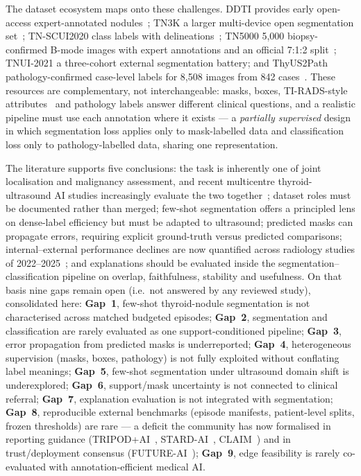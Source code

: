 \documentclass[jimh,article,submit,moreauthors,pdftex]{Definitions/tsp}
\begin{document}
The dataset ecosystem maps onto these challenges. DDTI provides early
open-access expert-annotated nodules~\cite{rev_pedraza2015ddti}; TN3K a
larger multi-device open segmentation set~\cite{rev_gong2021tn3k};
TN-SCUI2020 class labels with delineations~\cite{rev_zhou2020tnscui};
TN5000 5{,}000 biopsy-confirmed B-mode images with expert annotations and
an official 7:1:2 split~\cite{rev_zhang2025tn5000}; TNUI-2021 a
three-cohort external segmentation battery; and ThyUS2Path
pathology-confirmed case-level labels for 8{,}508 images from 842
cases~\cite{rev_hou2024thyus2path}. These resources are complementary,
not interchangeable: masks, boxes, TI-RADS-style
attributes~\cite{rev_tessler2017tirads} and
pathology labels answer different clinical questions, and a realistic
pipeline must use each annotation where it exists --- a
\emph{partially supervised} design in which segmentation loss applies
only to mask-labelled data and classification loss only to
pathology-labelled data, sharing one representation.

The literature supports five conclusions: the task is inherently one of
joint localisation and malignancy assessment, and recent multicentre
thyroid-ultrasound AI studies increasingly evaluate the two
together~\cite{rev_chen2024composition,rev_zhou2025tnvis,rev_zhan2025meta,rev_ni2025meta};
dataset roles must be documented rather than merged; few-shot segmentation
offers a principled lens on dense-label efficiency but must be adapted to
ultrasound; predicted masks can propagate errors, requiring explicit
ground-truth versus predicted comparisons; internal--external performance
declines are now quantified across radiology studies of 2022--2025~\cite{rev_suleman2025generaliz};
and explanations should be evaluated inside
the segmentation--classification pipeline on overlap, faithfulness,
stability and usefulness. On that basis nine gaps remain open (i.e.~not
answered by any reviewed study), consolidated here:
\textbf{Gap~1}, few-shot thyroid-nodule segmentation is not characterised
across matched budgeted episodes; \textbf{Gap~2}, segmentation and
classification are rarely evaluated as one support-conditioned pipeline;
\textbf{Gap~3}, error propagation from predicted masks is underreported;
\textbf{Gap~4}, heterogeneous supervision (masks, boxes, pathology) is
not fully exploited without conflating label meanings; \textbf{Gap~5},
few-shot segmentation under ultrasound domain shift is underexplored;
\textbf{Gap~6}, support/mask uncertainty is not connected to clinical
referral; \textbf{Gap~7}, explanation evaluation is not integrated with
segmentation; \textbf{Gap~8}, reproducible external benchmarks
(episode manifests, patient-level splits, frozen thresholds) are rare
--- a deficit the community has now formalised in reporting guidance
(TRIPOD+AI~\cite{rev_collins2024tripod},
STARD-AI~\cite{rev_sounderajah2025stardai},
CLAIM~\cite{rev_tejani2024claim}) and in trust/deployment consensus
(FUTURE-AI~\cite{rev_lekadir2025futureai});
\textbf{Gap~9}, edge feasibility is rarely co-evaluated with
annotation-efficient medical AI.
\end{document}
